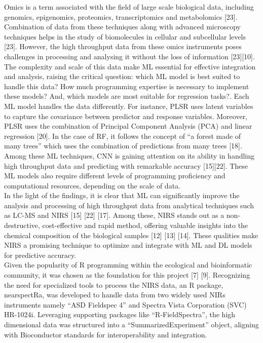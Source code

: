 \documentclass[12pt,a4paper]{report}
\begin{document}
Omics is a term associated with the field of large scale biological data, including genomics, epigenomics, proteomics, transcriptomics and metabolomics [23]. Combination of data from these techniques along with advanced microscopy techniques helps in the study of biomolecules in cellular and subcellular levels [23]. However, the high throughput data from these omics instruments poses challenges in processing and analysing it without the loss of information [23][10]. 
The complexity and scale of this data make ML essential for effective integration and analysis, raising the critical question: which ML model is best suited to handle this data? How much programming expertise is necessary to implement these models? And, which models are most suitable for regression tasks?. Each ML model handles the data differently. For instance, PLSR uses latent variables to capture the covariance between predictor and response variables. Moreover, 
PLSR uses the combination of Principal Component Analysis (PCA) and linear regression [20]. In the case of RF, it follows the concept of “a forest made of many trees” which uses the combination of predictions from many trees [18]. Among these ML techniques, CNN is gaining attention on its ability in handling high throughput data and predicting with remarkable accuracy [15][22]. These ML models also require different levels of programming proficiency and computational resources, depending on the scale of data. \\


In the light of the findings, it is clear that ML can significantly improve the analysis and processing of high throughput data from analytical techniques such as LC-MS and NIRS [15] [22] [17]. Among these, NIRS stands out as a non-destructive, cost-effective and rapid method, offering valuable insights into the chemical composition of the biological samples [12] [13] [14]. These qualities make NIRS a promising technique to optimize and integrate with ML and DL models for predictive accuracy. \\


Given the popularity of R programming within the ecological and bioinformatic community, it was chosen as the foundation for this project [7] [9]. Recognizing the need for specialized tools to process the NIRS data, an R package, nearspectRa, was developed to handle data from two widely used NIRs instruments namely “ASD Fieldspec 4” and Spectra Vista Corporation (SVC) HR-1024i. 
Leveraging supporting packages like “R-FieldSpectra”, the high dimensional data was structured into a “SummarizedExperiment” object, aligning with Bioconductor standards for interoperability and integration. \\
\end{document}

